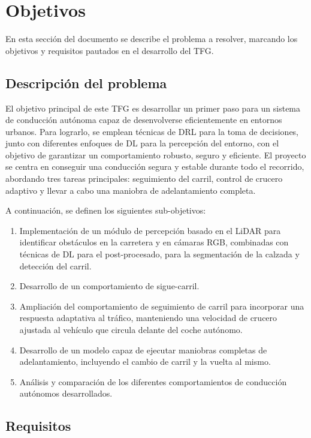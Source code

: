 \chapter{Objetivos}
\label{cap:capitulo2}

En esta sección del documento se describe el problema a resolver, marcando los objetivos y requisitos pautados en el desarrollo del \ac{TFG}.

\section{Descripción del problema}
\label{sec:descripcion}

El objetivo principal de este \ac{TFG} es desarrollar un primer paso para un sistema de conducción autónoma capaz de desenvolverse eficientemente en entornos urbanos. Para lograrlo, se emplean técnicas de \ac{DRL} para la toma de decisiones, junto con diferentes enfoques de \ac{DL} para la percepción del entorno, con el objetivo de garantizar un comportamiento robusto, seguro y eficiente. El proyecto se centra en conseguir una conducción segura y estable durante todo el recorrido, abordando tres tareas principales: seguimiento del carril, control de crucero adaptivo y llevar a cabo una maniobra de adelantamiento completa.

A continuación, se definen los siguientes sub-objetivos: 

\begin{enumerate}
\item Implementación de un módulo de percepción basado en el \ac{LiDAR} para identificar obstáculos en la carretera y en cámaras RGB, combinadas con técnicas de \ac{DL} para el post-procesado, para la segmentación de la calzada y detección del carril.
\item Desarrollo de un comportamiento de sigue-carril.
\item Ampliación del comportamiento de seguimiento de carril para incorporar una respuesta adaptativa al tráfico, manteniendo una velocidad de crucero ajustada al vehículo que circula delante del coche autónomo.
\item Desarrollo de un modelo capaz de ejecutar maniobras completas de adelantamiento, incluyendo el cambio de carril y la vuelta al mismo.
\item Análisis y comparación de los diferentes comportamientos de conducción autónomos desarrollados.
\end{enumerate}

\section{Requisitos}
\label{sec:requisitos}

